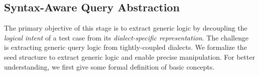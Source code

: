 \documentclass[sigconf,review,anonymous]{acmart}
\begin{document}


\subsection{Syntax-Aware Query Abstraction}
\label{sec:abstraction}

The primary objective of this stage is to extract generic logic by decoupling the \textit{logical intent} of a test case from its \textit{dialect-specific representation}. 
The challenge is extracting generic query logic from tightly-coupled dialects.
We formalize the seed structure to extract generic logic and enable precise manipulation.
For better understanding, we first give some formal definition of basic concepts.




\end{document}
